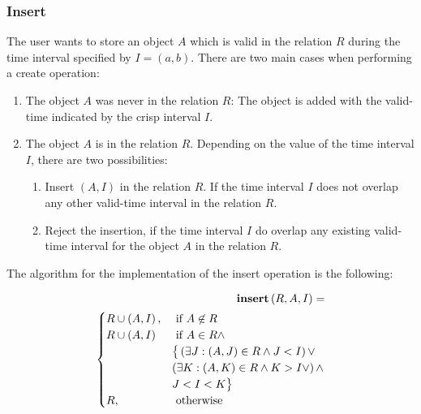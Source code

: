\subsubsection{\label{subsubsec:insert}Insert}
The user wants to store an object $A$ which is valid in the relation $R$ during the time interval specified by $I = \left(a, b \right)$.
%
%
There are two main cases when performing a create operation:
\begin{enumerate}
\item The object $A$ was never in the relation $R$: The object is added with the valid-time indicated by the crisp interval $I$.

\item The object $A$ is in the relation $R$. Depending on the value of the time interval $I$, there are two possibilities:
	\begin{enumerate}
	\item Insert $\left(A, I\right)$ in the relation $R$. If the time interval $I$ does not overlap any other valid-time interval in the relation $R$.
	\item Reject the insertion, if the time interval $I$ do overlap any existing valid-time interval for the object $A$ in the relation $R$.
	\end{enumerate}

\end{enumerate}

The algorithm for the implementation of the insert operation is the following:

\begin{align}
\label{eq:insert}
\mbox{\textbf{insert}} \left(R ,A, I\right) =\\
\begin{cases}
\nonumber
R \cup \left(A, I \right), & \mbox{ if }  A \not \in R\\
R \cup   \left(A, I \right) & \mbox{ if }  A \in R \wedge \\
& \big \lbrace \left( \exists J: \left(A, J \right) \in R \wedge J<I  \right) \vee \\
& \left( \exists K: \left(A, K \right) \in R \wedge K>I \vee \right) \wedge\\
&  J<I<K  \big \rbrace\\
R, & \mbox{ otherwise }  
\end{cases} 	
\end{align}

